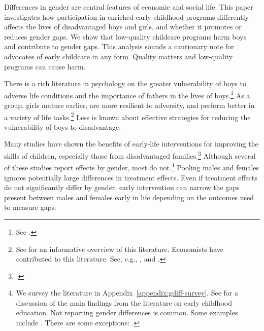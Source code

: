 Differences in gender are central features of economic and social life. This paper investigates how participation in enriched early childhood programs differently affects the lives of disadvantaged boys and girls, and whether it promotes or reduces gender gaps. We show that low-quality childcare programs harm boys and contribute to gender gaps. This analysis sounds a cautionary note for advocates of early childcare in any form. Quality matters and low-quality programs can cause harm.

There is a rich literature in psychology on the greater vulnerability of boys to adverse life conditions and the importance of fathers in the lives of boys.\footnote{See \citet{golding2016psychology}.} As a group, girls mature earlier, are more resilient to adversity, and perform better in a variety of life tasks.\footnote{See \citet{Schore_2017_IMHJ} for an informative overview of this literature. Economists have contributed to this literature. See, e.g., \citet{Bertrand_Pan_2013_AEJAE}, \citet{Autor-etal_2015_Family-Disadvantage} and \citet{Kottelenberg-Lehrer_2014_Gender-Effects}.} Less is known about effective strategies for reducing the vulnerability of boys to disadvantage.

Many studies have shown the benefits of early-life interventions for improving the skills of children, especially those from disadvantaged families.\footnote{\citet{Currie_2011_AER,Elango_Hojman_etal_2016_Early-Edu}.} Although several of these studies report effects by gender, most do not.\footnote{We survey the literature in Appendix~\ref{appendix:gdiff-survey}. See \citet{Elango_Hojman_etal_2016_Early-Edu} for a discussion of the main findings from the literature on early childhood education. Not reporting gender differences is common. Some examples include \citet{Bernal_Keane_2011_JoLE,Cascio_Schanzenbach_2013_ImpactsExpandingAccess,Bitler_et_al_2014_Head_Start_Unpublished,Kline_Walters_2016_QJE}. There are some exceptions: \citet{Heckman_Moon_etal_2010_QE,Campbell_Conti_etal_2014_EarlyChildhoodInvestments,Garcia_Heckman_Leaf_etal_2017_Comp_CBA_Unpublished}.} Pooling males and females ignores potentially large differences in treatment effects. Even if treatment effects do not significantly differ by gender, early intervention can narrow the gaps present between males and females early in life depending on the outcomes used to measure gaps.

